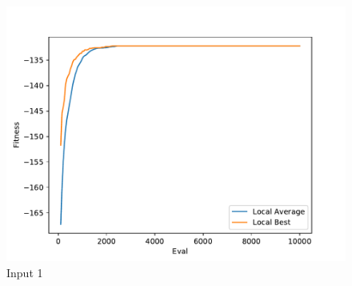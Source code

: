 \documentclass{standalone}
\begin{document}
\begin{figure}[!htb]
	\caption{Input 1}
	\label{fig:graph_1077}
	\includegraphics[width=\textwidth]{../graphs/graphs/1077.pdf}
\end{figure}
\end{document}
